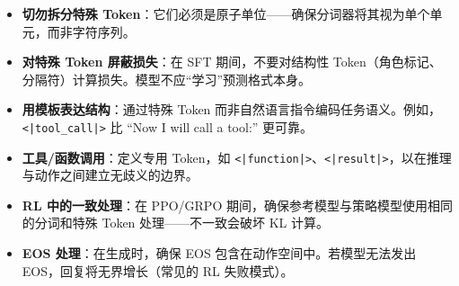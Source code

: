 \newpage
\begin{keybox}
\begin{itemize}
  \item \textbf{切勿拆分特殊 Token}：它们必须是原子单位——确保分词器将其视为单个单元，而非字符序列。
  \item \textbf{对特殊 Token 屏蔽损失}：在 SFT 期间，不要对结构性 Token（角色标记、分隔符）计算损失。模型不应``学习''预测格式本身。
  \item \textbf{用模板表达结构}：通过特殊 Token 而非自然语言指令编码任务语义。例如，\texttt{<|tool\_call|>} 比 ``Now I will call a tool:'' 更可靠。
  \item \textbf{工具/函数调用}：定义专用 Token，如 \texttt{<|function|>}、\texttt{<|result|>}，以在推理与动作之间建立无歧义的边界。
  \item \textbf{RL 中的一致处理}：在 PPO/GRPO 期间，确保参考模型与策略模型使用相同的分词和特殊 Token 处理——不一致会破坏 KL 计算。
  \item \textbf{EOS 处理}：在生成时，确保 EOS 包含在动作空间中。若模型无法发出 EOS，回复将无界增长（常见的 RL 失败模式）。
\end{itemize}
\end{keybox}

